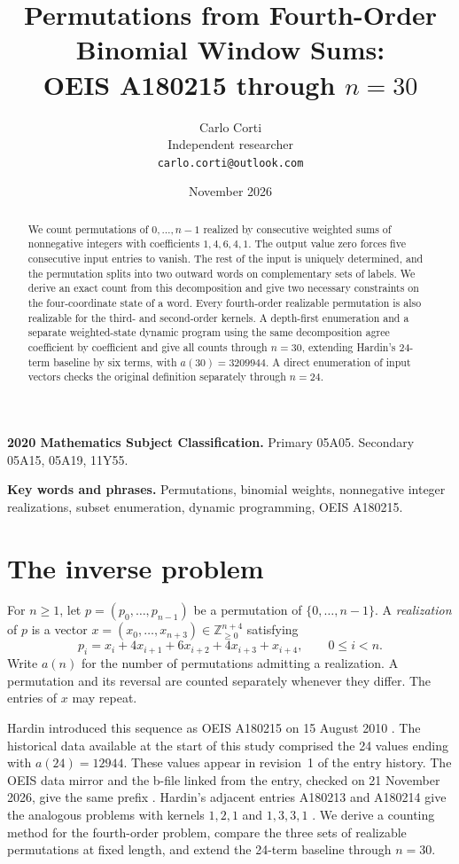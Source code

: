 \documentclass[11pt]{article}
\title{Permutations from Fourth-Order Binomial Window Sums:\\[2pt]
OEIS A180215 through \(n=30\)}
\author{Carlo Corti\\Independent researcher\\\texttt{carlo.corti@outlook.com}}
\date{November 2026}
\newcommand{\NN}{\mathbb Z_{\geq 0}}
\begin{document}
\maketitle

\begin{abstract}
We count permutations of \(0,\ldots,n-1\) realized by consecutive
weighted sums of nonnegative integers with coefficients \(1,4,6,4,1\).
The output value zero forces five consecutive input entries to vanish.
The rest of the input is uniquely determined, and the permutation splits
into two outward words on complementary sets of labels. We derive an exact
count from this decomposition and give two necessary constraints on the
four-coordinate state of a word. Every fourth-order realizable permutation
is also realizable for the third- and second-order kernels. A depth-first
enumeration and a separate weighted-state dynamic program using the same
decomposition agree coefficient by coefficient and give
all counts through \(n=30\), extending Hardin's 24-term baseline by six
terms, with \(a(30)=3209944\). A direct enumeration of input vectors checks
the original definition separately through \(n=24\).
\end{abstract}

\noindent\textbf{2020 Mathematics Subject Classification.}
Primary 05A05. Secondary 05A15, 05A19, 11Y55.

\smallskip
\noindent\textbf{Key words and phrases.}
Permutations, binomial weights, nonnegative integer realizations,
subset enumeration, dynamic programming, OEIS A180215.

\section{The inverse problem}

For \(n\geq 1\), let \(p=(p_0,\ldots,p_{n-1})\) be a permutation of
\(\{0,\ldots,n-1\}\). A \emph{realization} of \(p\) is a vector
\(x=(x_0,\ldots,x_{n+3})\in\NN^{n+4}\) satisfying
\begin{equation}
 p_i=x_i+4x_{i+1}+6x_{i+2}+4x_{i+3}+x_{i+4},
 \qquad 0\leq i<n.
 \label{eq:definition}
\end{equation}
Write \(a(n)\) for the number of permutations admitting a realization.
A permutation and its reversal are counted separately whenever they
differ. The entries of \(x\) may repeat.

Hardin introduced this sequence as OEIS A180215 on 15 August 2010
\cite{hardin215}. The historical data available at the start of this
study comprised the 24 values ending with \(a(24)=12944\). These values
appear in revision~1 of the entry history. The OEIS data mirror and the
b-file linked from the entry, checked on 21 November 2026, give the
same prefix \cite{hardin215}. Hardin's adjacent entries A180213 and A180214 give
the analogous problems with kernels \(1,2,1\) and \(1,3,3,1\)
\cite{hardin213,hardin214}. We derive a counting method for the
fourth-order problem, compare the three sets of realizable permutations
at fixed length, and extend the 24-term baseline through \(n=30\).
\end{document}
